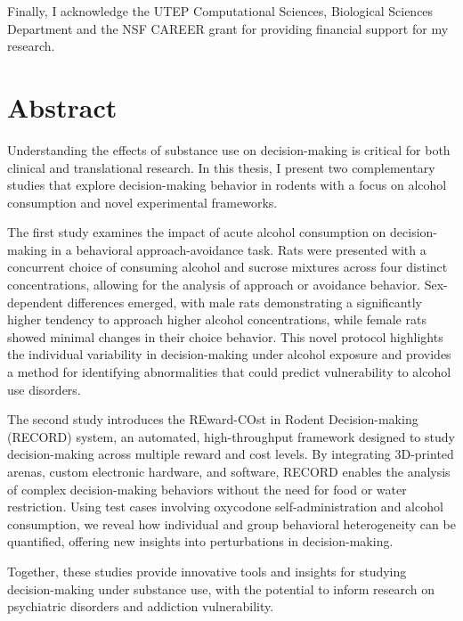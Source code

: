 \documentclass{article}
\begin{document}
Finally, I acknowledge the UTEP Computational Sciences, Biological Sciences Department and the NSF CAREER grant for providing financial support for my research.
\clearpage

\section*{Abstract}

Understanding the effects of substance use on decision-making is critical for both clinical and translational research. In this thesis, I present two complementary studies that explore decision-making behavior in rodents with a focus on alcohol consumption and novel experimental frameworks.

\vspace{1em}

The first study examines the impact of acute alcohol consumption on decision-making in a behavioral approach-avoidance task. Rats were presented with a concurrent choice of consuming alcohol and sucrose mixtures across four distinct concentrations, allowing for the analysis of approach or avoidance behavior. Sex-dependent differences emerged, with male rats demonstrating a significantly higher tendency to approach higher alcohol concentrations, while female rats showed minimal changes in their choice behavior. This novel protocol highlights the individual variability in decision-making under alcohol exposure and provides a method for identifying abnormalities that could predict vulnerability to alcohol use disorders.

\vspace{1em}

The second study introduces the REward-COst in Rodent Decision-making (RECORD) system, an automated, high-throughput framework designed to study decision-making across multiple reward and cost levels. By integrating 3D-printed arenas, custom electronic hardware, and software, RECORD enables the analysis of complex decision-making behaviors without the need for food or water restriction. Using test cases involving oxycodone self-administration and alcohol consumption, we reveal how individual and group behavioral heterogeneity can be quantified, offering new insights into perturbations in decision-making.

\vspace{1em}

Together, these studies provide innovative tools and insights for studying decision-making under substance use, with the potential to inform research on psychiatric disorders and addiction vulnerability.
\end{document}
